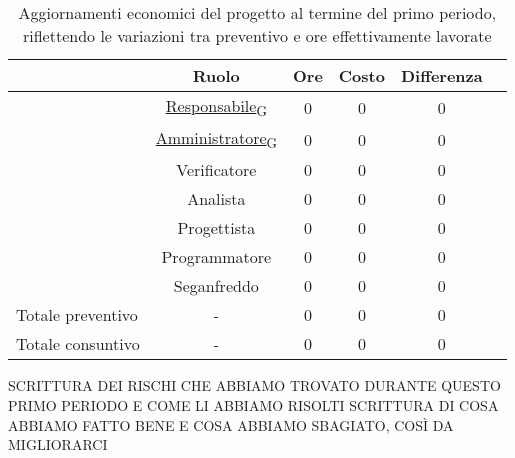         \begin{table}[!h]
            \centering
            \begin{tabular}{|l| c| c| c| c| c| } 
                \hline
                \textbf{} & \textbf{Ruolo} & \textbf{Ore} & \textbf{Costo} &\textbf{Differenza} \\
                \hline  
                 & \href{https://7last.github.io/docs/rtb/documentazione-interna/glossario\#responsabile}{Responsabile\textsubscript{G}}        & 0 & 0 & 0 \\ 
                 & \href{https://7last.github.io/docs/rtb/documentazione-interna/glossario\#amministratore}{Amministratore\textsubscript{G}}      & 0 & 0 & 0 \\ 
                 & Verificatore        & 0 & 0 & 0 \\ 
                 & Analista            & 0 & 0 & 0 \\ 
                 & Progettista         & 0 & 0 & 0 \\ 
                 & Programmatore       & 0 & 0 & 0 \\ 
                 & Seganfreddo         & 0 & 0 & 0 \\
                Totale preventivo & - & 0 & 0 &0 \\
                Totale consuntivo & - & 0 & 0 & 0\\
                \hline
            \end{tabular}
            \caption{Aggiornamenti economici del progetto al termine del primo periodo, riflettendo le variazioni tra preventivo e ore effettivamente lavorate}
            \label{tab:3}
        \end{table}
        SCRITTURA DEI RISCHI CHE ABBIAMO TROVATO DURANTE QUESTO PRIMO PERIODO E COME LI ABBIAMO RISOLTI
        SCRITTURA DI COSA ABBIAMO FATTO BENE E COSA ABBIAMO SBAGIATO, COSÌ DA MIGLIORARCI
\newpage
